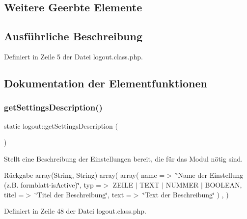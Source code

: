 \subsection*{Weitere Geerbte Elemente}


\subsection{Ausführliche Beschreibung}


Definiert in Zeile 5 der Datei logout.\+class.\+php.



\subsection{Dokumentation der Elementfunktionen}
\mbox{\label{classlogout_a85a712a3d758d4da442b56db43327da7}} 
\subsubsection{\texorpdfstring{get\+Settings\+Description()}{getSettingsDescription()}}
{\footnotesize\ttfamily static logout\+::get\+Settings\+Description (\begin{DoxyParamCaption}{ }\end{DoxyParamCaption})\hspace{0.3cm}{\ttfamily [static]}}

Stellt eine Beschreibung der Einstellungen bereit, die für das Modul nötig sind. \begin{DoxyReturn}{Rückgabe}
array(\+String, String) array( array( \textquotesingle{}name\textquotesingle{} =$>$ \char`\"{}\+Name der Einstellung (z.\+B. formblatt-\/is\+Active)\char`\"{}, \textquotesingle{}typ\textquotesingle{} =$>$ Z\+E\+I\+LE $\vert$ T\+E\+XT $\vert$ N\+U\+M\+M\+ER $\vert$ B\+O\+O\+L\+E\+AN, \textquotesingle{}titel\textquotesingle{} =$>$ \char`\"{}\+Titel der Beschreibung\char`\"{}, \textquotesingle{}text\textquotesingle{} =$>$ \char`\"{}\+Text der Beschreibung\char`\"{} ) , ) 
\end{DoxyReturn}


Definiert in Zeile 48 der Datei logout.\+class.\+php.

\mbox{\label{classlogout_ad0c9921800fa15d7a2755774b8d2f947}} 

